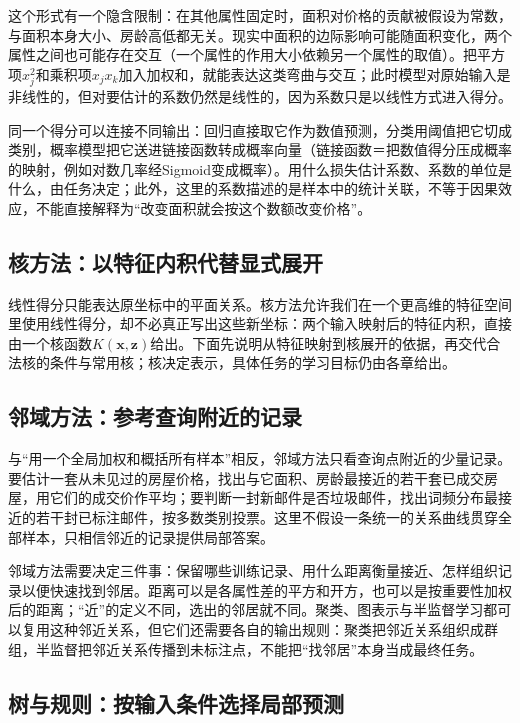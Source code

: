 这个形式有一个隐含限制：在其他属性固定时，面积对价格的贡献被假设为常数，与面积本身大小、房龄高低都无关。现实中面积的边际影响可能随面积变化，两个属性之间也可能存在交互（一个属性的作用大小依赖另一个属性的取值）。把平方项$x_j^2$和乘积项$x_jx_k$加入加权和，就能表达这类弯曲与交互；此时模型对原始输入是非线性的，但对要估计的系数仍然是线性的，因为系数只是以线性方式进入得分。

同一个得分可以连接不同输出：回归直接取它作为数值预测，分类用阈值把它切成类别，概率模型把它送进链接函数转成概率向量（链接函数＝把数值得分压成概率的映射，例如对数几率经Sigmoid变成概率）。用什么损失估计系数、系数的单位是什么，由任务决定；此外，这里的系数描述的是样本中的统计关联，不等于因果效应，不能直接解释为“改变面积就会按这个数额改变价格”。

\subsection{核方法：以特征内积代替显式展开}
\label{sec:classic-overview-kernel}

线性得分只能表达原坐标中的平面关系。核方法允许我们在一个更高维的特征空间里使用线性得分，却不必真正写出这些新坐标：两个输入映射后的特征内积，直接由一个核函数$K(\bm x,\bm z)$给出。下面先说明从特征映射到核展开的依据，再交代合法核的条件与常用核；核决定表示，具体任务的学习目标仍由各章给出。



\subsection{邻域方法：参考查询附近的记录}
\label{sec:classic-overview-neighborhood}

与“用一个全局加权和概括所有样本”相反，邻域方法只看查询点附近的少量记录。要估计一套从未见过的房屋价格，找出与它面积、房龄最接近的若干套已成交房屋，用它们的成交价作平均；要判断一封新邮件是否垃圾邮件，找出词频分布最接近的若干封已标注邮件，按多数类别投票。这里不假设一条统一的关系曲线贯穿全部样本，只相信邻近的记录提供局部答案。

邻域方法需要决定三件事：保留哪些训练记录、用什么距离衡量接近、怎样组织记录以便快速找到邻居。距离可以是各属性差的平方和开方，也可以是按重要性加权后的距离；“近”的定义不同，选出的邻居就不同。聚类、图表示与半监督学习都可以复用这种邻近关系，但它们还需要各自的输出规则：聚类把邻近关系组织成群组，半监督把邻近关系传播到未标注点，不能把“找邻居”本身当成最终任务。

\subsection{树与规则：按输入条件选择局部预测}
\label{sec:classic-overview-trees-rules}


